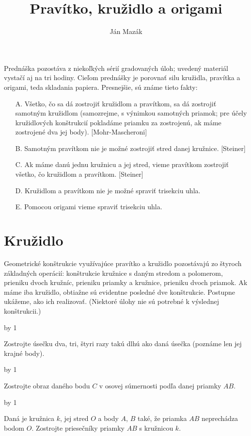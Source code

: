 \documentclass[a4paper]{article}
\title{Pravítko, kružidlo a origami}
\author{Ján Mazák}
\def\pr{
    \smallskip
    \noindent {\bf \the\problemNumber.}
    \advance\problemNumber by 1
}
\begin{document}
\vskip -1cm
\vskip -1cm

\maketitle

Prednáška pozostáva z niekoľkých sérií gradovaných úloh; uvedený materiál vystačí aj na tri hodiny.
Cieľom prednášky je porovnať silu kružidla, pravítka a origami, teda skladania papiera.
Presnejšie, sú známe tieto fakty:

\begin{itemize}
\item[A.] Všetko, čo sa dá zostrojiť kružidlom a pravítkom, sa dá zostrojiť samotným kružidlom (samozrejme, s výnimkou samotných priamok; pre účely kružidlových konštrukcií pokladáme priamku za zostrojenú, ak máme zostrojené dva jej body). [Mohr-Mascheroni]

\item[B.] Samotným pravítkom nie je možné zostrojiť stred danej kružnice. [Steiner]

\item[C.] Ak máme danú jednu kružnicu a jej stred, vieme pravítkom zostrojiť všetko, čo kružidlom a pravítkom. [Steiner]

\item[D.] Kružidlom a pravítkom nie je možné spraviť trisekciu uhla.

\item[E.] Pomocou origami vieme spraviť trisekciu uhla.
\end{itemize}


\section{Kružidlo}

Geometrické konštrukcie využívajúce pravítko a kružidlo pozostávajú zo štyroch základných operácií: konštrukcie kružnice s daným stredom a polomerom,
prieniku dvoch kružníc, prieniku priamky a kružnice, prieniku dvoch priamok.
Ak máme iba kružidlo, obtiažne sú evidentne posledné dve konštrukcie. Postupne ukážeme, ako ich realizovať. (Niektoré úlohy nie sú potrebné k výslednej konštrukcii.)

\pr
Zostrojte úsečku dva, tri, štyri razy takú dlhú ako daná úsečka (poznáme len jej krajné body).

\pr
Zostrojte obraz daného bodu $C$ v osovej súmernosti podľa danej priamky $AB$.

\pr
Daná je kružnica $k$, jej stred $O$ a body $A$, $B$ také, že priamka $AB$ neprechádza bodom $O$.
Zostrojte priesečníky priamky $AB$ s kružnicou $k$.
\end{document}
